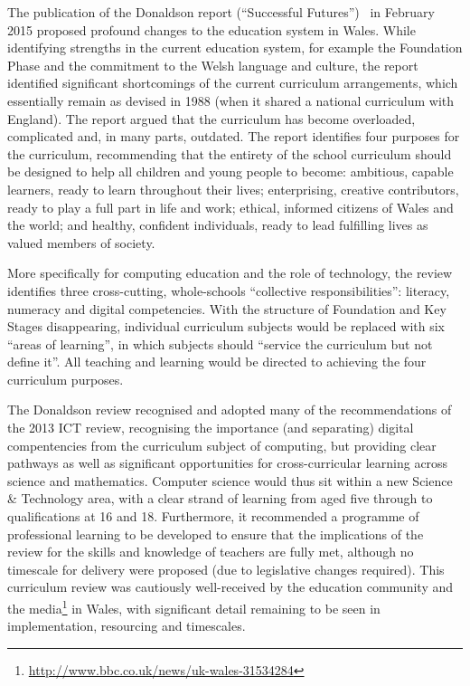 \documentclass{sig-alternate}
\begin{document}
The publication of the Donaldson report (``Successful
Futures'')~\cite{Donaldson:2015} in February 2015 proposed profound
changes to the education system in Wales. While identifying strengths
in the current education system, for example the Foundation Phase and
the commitment to the Welsh language and culture, the report
identified significant shortcomings of the current curriculum
arrangements, which essentially remain as devised in 1988 (when it
shared a national curriculum with England). The report argued that the
curriculum has become overloaded, complicated and, in many parts,
outdated. The report identifies four purposes for the curriculum,
recommending that the entirety of the school curriculum should be
designed to help all children and young people to become: ambitious,
capable learners, ready to learn throughout their lives; enterprising,
creative contributors, ready to play a full part in life and work;
ethical, informed citizens of Wales and the world; and healthy,
confident individuals, ready to lead fulfilling lives as valued
members of society.

More specifically for computing education and the role of technology,
the review identifies three cross-cutting, whole-schools ``collective
responsibilities'': literacy, numeracy and digital competencies. With
the structure of Foundation and Key Stages disappearing, individual
curriculum subjects would be replaced with six ``areas of learning'',
in which subjects should ``service the curriculum but not define
it''. All teaching and learning would be directed to achieving the
four curriculum purposes.

The Donaldson review recognised and adopted many of the
recommendations of the 2013 ICT review, recognising the importance
(and separating) digital compentencies from the curriculum subject of
computing, but providing clear pathways as well as significant
opportunities for cross-curricular learning across science and
mathematics. Computer science would thus sit within a new Science \&
Technology area, with a clear strand of learning from aged five
through to qualifications at 16 and 18. Furthermore, it recommended a
programme of professional learning to be developed to ensure that the
implications of the review for the skills and knowledge of teachers
are fully met, although no timescale for delivery were proposed (due
to legislative changes required). This curriculum review was
cautiously well-received by the education community and the
media\footnote{\url{http://www.bbc.co.uk/news/uk-wales-31534284}} in
Wales, with significant detail remaining to be seen in implementation,
resourcing and timescales.
\end{document}
